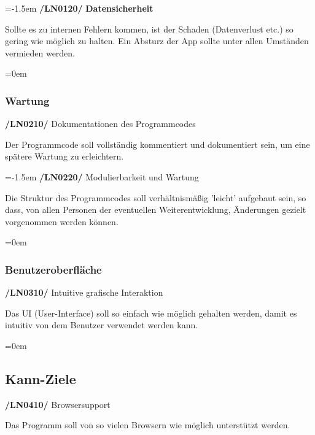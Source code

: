 \documentclass[11pt,a4paper]{report}
\begin{document}
\leftskip=-1.5em
\textbf{/LN0120/} \textbf{Datensicherheit}
\par
\begingroup
\leftskip=1cm
\noindent Sollte es zu internen Fehlern kommen, ist der Schaden (Datenverlust etc.) so gering wie möglich zu halten.
Ein Absturz der App sollte unter allen Umständen vermieden werden.\\
\par
\endgroup

\leftskip=0em
\subsubsection{Wartung}

\textbf{/LN0210/} Dokumentationen des Programmcodes
\par
\begingroup
\leftskip=1cm
\noindent Der Programmcode soll vollständig kommentiert und dokumentiert sein, um eine spätere Wartung zu erleichtern.\\
\par
\endgroup

\newpage
\leftskip=-1.5em
\textbf{/LN0220/} Modulierbarkeit und Wartung
\par
\begingroup
\leftskip=1cm
\noindent Die Struktur des Programmcodes soll verhältnismäßig 'leicht' aufgebaut sein, so dass, von allen Personen der eventuellen Weiterentwicklung, Änderungen gezielt vorgenommen werden können.\\
\par
\endgroup

\leftskip=0em
\subsubsection{Benutzeroberfläche}

\textbf{/LN0310/} Intuitive grafische Interaktion
\par
\begingroup
\leftskip=1cm
\noindent Das UI (User-Interface) soll so einfach wie möglich gehalten werden, damit es intuitiv von dem Benutzer verwendet werden kann.\\
\par
\endgroup

\leftskip=0em
\subsection{Kann-Ziele}
\textbf{/LN0410/} Browsersupport
\par
\begingroup
\leftskip=1cm
\noindent Das Programm soll von so vielen Browsern wie möglich unterstützt werden.\\
\par
\endgroup
\end{document}
